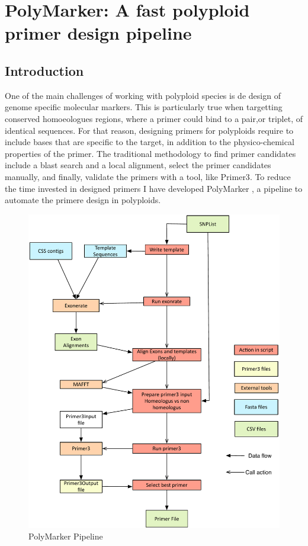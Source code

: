 
\chapter{PolyMarker: A fast polyploid primer design pipeline}
\section{Introduction} 
One of the main challenges of working with polyploid species is de design of genome specific molecular markers. 
This is particularly true when targetting conserved homoeologues regions, where a primer could bind to a pair,or triplet, of identical sequences. 
For that reason, designing primers for polyploids require to include bases that are specific to the target, in addition to the physico-chemical properties of the primer.  
The traditional methodology to find primer candidates include a blast search and a local alignment, select the primer candidates manually, and finally, validate the primers with a tool, like Primer3\cite{Rozen}. 
To reduce the time invested in designed primers I have developed PolyMarker \cite{Ramirez-Gonzalez2015a}, a pipeline to automate the primere design in polyploids.  

\begin{figure}
\includegraphics[width=1\textwidth]{PolyMarker/Figures/pipeline.pdf}
        \caption{PolyMarker Pipeline}
        \label{fig:poly:pipeline}
\end{figure}


